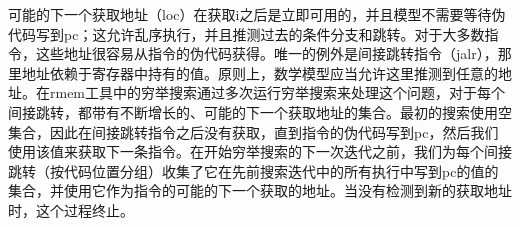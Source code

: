 \begin{commentary}

  可能的下一个获取地址（loc）在获取i之后是立即可用的，并且模型不需要等待伪代码写到pc；这允许乱序执行，并且推测过去的条件分支和跳转。对于大多数指令，这些地址很容易从指令的伪代码获得。唯一的例外是间接跳转指令（jalr），那里地址依赖于寄存器中持有的值。原则上，数学模型应当允许这里推测到任意的地址。在rmem工具中的穷举搜索通过多次运行穷举搜索来处理这个问题，对于每个间接跳转，都带有不断增长的、可能的下一个获取地址的集合。最初的搜索使用空集合，因此在间接跳转指令之后没有获取，直到指令的伪代码写到pc，然后我们使用该值来获取下一条指令。在开始穷举搜索的下一次迭代之前，我们为每个间接跳转（按代码位置分组）收集了它在先前搜索迭代中的所有执行中写到pc的值的集合，并使用它作为指令的可能的下一个获取的地址。当没有检测到新的获取地址时，这个过程终止。
\end{commentary}

